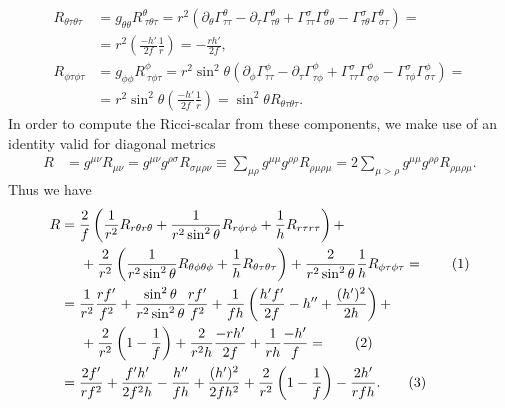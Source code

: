 \documentclass[english, parskip=full]{scrartcl}
\newcommand\numberthis{\addtocounter{equation}{1}\tag{\theequation}}
\newcommand{\kla}{}
\begin{document}
\begin{align}
R_{\theta\tau \theta\tau} &= g_{\theta\theta} R^\theta_{\ \tau \theta\tau} = r^2 \kla\left( \partial_\theta \Gamma^\theta_{\tau\tau} - \partial_\tau \Gamma^\theta_{\tau \theta} + \Gamma^\sigma_{\tau\tau}\Gamma^\theta_{\sigma \theta} - \Gamma^\sigma_{\tau \theta} \Gamma^\theta_{\sigma\tau} \right) = \\
&= r^2 \kla\left( \frac{-h'}{2f} \frac{1}{r} \right) = -\frac{rh'}{2f},\\
R_{\phi\tau \phi\tau} &= g_{\phi\phi} R^\phi_{\ \tau \phi\tau} = r^2\sin^2\theta \kla\left( \partial_\phi \Gamma^\phi_{\tau\tau} - \partial_\tau \Gamma^\phi_{\tau \phi} + \Gamma^\sigma_{\tau\tau}\Gamma^\phi_{\sigma \phi} - \Gamma^\sigma_{\tau \phi} \Gamma^\phi_{\sigma\tau} \right) = \\
&= r^2\sin^2\theta \kla\left( \frac{-h'}{2f} \frac{1}{r} \right) = \sin^2\theta R_{\theta\tau \theta\tau}.
\end{align}
In order to compute the Ricci-scalar from these components, we make use of an identity valid for diagonal metrics
\begin{align}
R &= g^{\mu\nu} R_{\mu\nu} = g^{\mu\nu} g^{\rho\sigma} R_{\sigma\mu \rho\nu} \equiv \sum_{\mu\rho} g^{\mu\mu} g^{\rho\rho} R_{\rho\mu\rho\mu} = 2\sum_{\mu > \rho} g^{\mu\mu} g^{\rho\rho} R_{\rho\mu\rho\mu}.
\end{align}
Thus we have
\begin{align*}
R &= \frac{2}{f} \kla\left( \frac{1}{r^2} R_{r\theta r\theta} + \frac{1}{r^2\sin^2\theta} R_{r\phi r\phi} + \frac{1}{h} R_{r\tau r\tau} \right) + \\
&\hspace{0.5cm} + \frac{2}{r^2} \kla\left( \frac{1}{r^2\sin^2\theta} R_{\theta\phi \theta\phi} + \frac{1}{h} R_{\theta\tau \theta\tau} \right) + \frac{2}{r^2\sin^2\theta} \frac{1}{h} R_{\phi\tau \phi\tau} = \numberthis  \\
&= \frac{1}{r^2}\frac{rf'}{f^2} + \frac{\sin^2\theta}{r^2\sin^2\theta} \frac{rf'}{f^2} + \frac{1}{fh} \kla\left( \frac{h'f'}{2f} - h'' + \frac{(h')^2}{2h} \right) + \\
&\hspace{0.5cm} + \frac{2}{r^2} \kla\left( 1 - \frac{1}{f} \right) + \frac{2}{r^2h} \frac{-rh'}{2f} + \frac{1}{rh} \frac{-h'}{f} =  \numberthis \\
&= \frac{2f'}{rf^2} + \frac{f'h'}{2f^2h} - \frac{h''}{fh} + \frac{(h')^2}{2fh^2} + \frac{2}{r^2} \kla\left( 1 - \frac{1}{f} \right) - \frac{2h'}{rfh}. \numberthis 
\end{align*}
\end{document}
